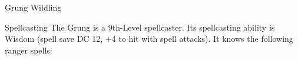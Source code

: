 \begin{DndMonster}[width=0.5\textwidth]{Grung Wildling\label{monster:GrungWildling}}
	\begin{DndMonsterSpells}
		\item[Spellcasting] The Grung is a 9th-Level spellcaster. Its spellcasting ability is Wisdom (spell save DC 12, +4 to hit with spell attacks). It knows the following ranger spells:
	\end{DndMonsterSpells}
\end{DndMonster}
